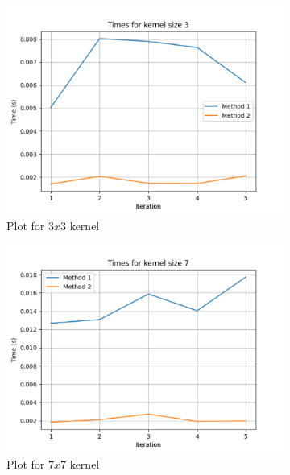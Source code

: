 \begin{figure}[h]
	\centering
	\begin{subfigure}{0.45\linewidth}
		\includegraphics[width=\linewidth]{../Problem 15/figure_kernel3.pdf}
		\caption{Plot for $3x3$ kernel}
		\label{fig:sample_kernel3}
	\end{subfigure}
	\begin{subfigure}{0.45\linewidth}
		\includegraphics[width=\linewidth]{../Problem 15/figure_kernel7.pdf}
		\caption{Plot for $7x7$ kernel}
		\label{fig:sample_kernel7}
	\end{subfigure}
	\begin{subfigure}{0.45\linewidth}

\end{subfigure}
\end{figure}
